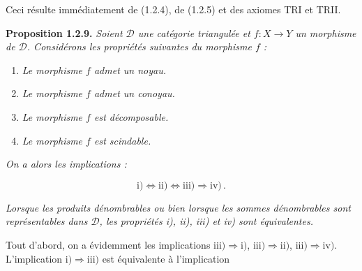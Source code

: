Ceci résulte immédiatement de (1.2.4), de (1.2.5) et des axiomes TRI et
TRII.

\medskip
\noindent\textbf{Proposition 1.2.9.}\quad
\emph{Soient $\mathcal D$ une catégorie triangulée et
$f\colon X\longrightarrow Y$ un morphisme de $\mathcal D$. Considérons les
propriétés suivantes du morphisme $f$ :}

\begin{enumerate}
\renewcommand{\labelenumi}{\roman{enumi})}
\item \emph{Le morphisme $f$ admet un noyau.}
\item \emph{Le morphisme $f$ admet un conoyau.}
\item \emph{Le morphisme $f$ est décomposable.}
\item \emph{Le morphisme $f$ est scindable.}
\end{enumerate}

\noindent\emph{On a alors les implications :}

\[
  \mathrm{i)}\Longleftrightarrow\mathrm{ii)}
  \Longleftrightarrow\mathrm{iii)}\Longrightarrow\mathrm{iv)}\,.
\]

\emph{Lorsque les produits dénombrables ou bien lorsque les sommes
dénombrables sont représentables dans $\mathcal D$, les propriétés
\textnormal{i)}, \textnormal{ii)}, \textnormal{iii)} et \textnormal{iv)}
sont équivalentes.}

Tout d'abord, on a évidemment les implications
$\mathrm{iii)}\Longrightarrow\mathrm{i)}$,
$\mathrm{iii)}\Longrightarrow\mathrm{ii)}$,
$\mathrm{iii)}\Longrightarrow\mathrm{iv)}$. L'implication
$\mathrm{i)}\Longrightarrow\mathrm{iii)}$ est équivalente à l'implication
\endgroup
